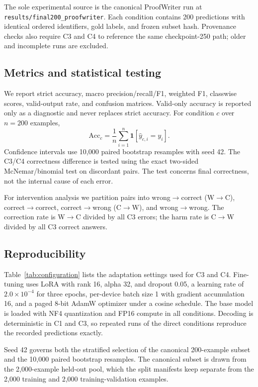 \documentclass[conference]{IEEEtran}
\begin{document}
The sole experimental source is the canonical ProofWriter run at \texttt{results/final200\_proofwriter}. Each condition contains 200 predictions with identical ordered identifiers, gold labels, and frozen subset hash. Provenance checks also require C3 and C4 to reference the same checkpoint-250 path; older and incomplete runs are excluded.



\subsection{Metrics and statistical testing}
We report strict accuracy, macro precision/recall/F1, weighted F1, classwise scores, valid-output rate, and confusion matrices. Valid-only accuracy is reported only as a diagnostic and never replaces strict accuracy. For condition $c$ over $n=200$ examples,
\begin{equation}
\mathrm{Acc}_c=\frac{1}{n}\sum_{i=1}^{n}\mathbf{1}[\hat y_{c,i}=y_i].
\end{equation}
Confidence intervals use 10,000 paired bootstrap resamples with seed 42. The C3/C4 correctness difference is tested using the exact two-sided McNemar/binomial test on discordant pairs. The test concerns final correctness, not the internal cause of each error.

For intervention analysis we partition pairs into wrong$\rightarrow$correct (W$\rightarrow$C), correct$\rightarrow$correct, correct$\rightarrow$wrong (C$\rightarrow$W), and wrong$\rightarrow$wrong. The correction rate is W$\rightarrow$C divided by all C3 errors; the harm rate is C$\rightarrow$W divided by all C3 correct answers.

\subsection{Reproducibility}
Table~\ref{tab:configuration} lists the adaptation settings used for C3 and C4. Fine-tuning uses LoRA with rank 16, alpha 32, and dropout 0.05, a learning rate of $2.0\times10^{-4}$ for three epochs, per-device batch size 1 with gradient accumulation 16, and a paged 8-bit AdamW optimizer under a cosine schedule. The base model is loaded with NF4 quantization and FP16 compute in all conditions. Decoding is deterministic in C1 and C3, so repeated runs of the direct conditions reproduce the recorded predictions exactly.

Seed 42 governs both the stratified selection of the canonical 200-example subset and the 10,000 paired bootstrap resamples. The canonical subset is drawn from the 2,000-example held-out pool, which the split manifests keep separate from the 2,000 training and 2,000 training-validation examples.
\end{document}
